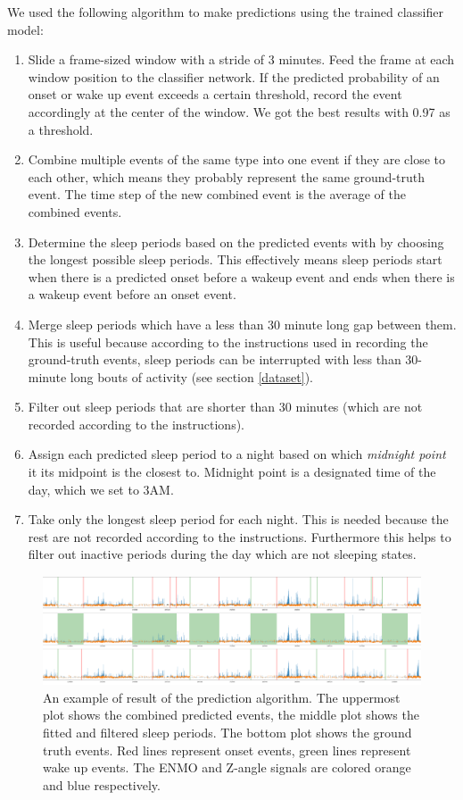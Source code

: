 \documentclass{article}
\begin{document}
We used the following algorithm to make predictions using the trained classifier model:
\begin{enumerate}
    \item Slide a frame-sized window with a stride of 3 minutes. Feed the frame at each window position to the classifier network. If the predicted probability of an onset or wake up event exceeds a certain threshold, record the event accordingly at the center of the window. We got the best results with 0.97 as a threshold.
    \item Combine multiple events of the same type into one event if they are close to each other, which means they probably represent the same ground-truth event. The time step of the new combined event is the average of the combined events.
    \item Determine the sleep periods based on the predicted events with by choosing the longest possible sleep periods. This effectively means sleep periods start when there is a predicted onset before a wakeup event and ends when there is a wakeup event before an onset event.
    \item Merge sleep periods which have a less than 30 minute long gap between them. This is useful because according to the instructions used in recording the ground-truth events, sleep periods can be interrupted with less than 30-minute long bouts of activity (see section \ref{dataset}).
    \item Filter out sleep periods that are shorter than 30 minutes (which are not recorded according to the instructions).
    \item Assign each predicted sleep period to a night based on which \textit{midnight point} it its midpoint is the closest to. Midnight point is a designated time of the day, which we set to 3AM.
    \item Take only the longest sleep period for each night. This is needed because the rest are not recorded according to the instructions. Furthermore this helps to filter out inactive periods during the day which are not sleeping states.
\end{enumerate}

\begin{figure}
    \centering
    \includegraphics[width=\textwidth]{cpd_prediction_plot.png}
    \caption{An example of result of the prediction algorithm. The uppermost plot shows the combined predicted events, the middle plot shows the fitted and filtered sleep periods. The bottom plot shows the ground truth events. Red lines represent onset events, green lines represent wake up events. The ENMO and Z-angle signals are colored orange and blue respectively.}
    \label{fig:cpd-prediction-algorithm}
\end{figure}
\end{document}
